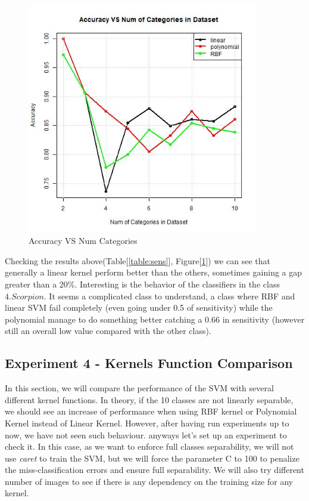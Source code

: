 \begin{minipage}{0.55\textwidth}
\begin{figure}[H]
\centering
\includegraphics[width=0.9\textwidth]{Images/Number_categories_vs_accuracystarfish_minaret.jpeg}
\caption{Accuracy VS Num Categories}
\label{fig:exp3}
\end{figure}
\end{minipage}

Checking the results above(Table[\ref{table:sens}], Figure[\ref{fig:exp3}]) we can see that generally a linear kernel perform better than the others, sometimes gaining a gap greater than a 20\%. Interesting is the behavior of the classifiers in the class $4. Scorpion$. It seems a complicated class to understand, a class where RBF and linear SVM fail completely (even going under 0.5 of sensitivity) while the polynomial manage to do something better catching a 0.66 in sensitivity (however still an overall low value compared with the other class).

\subsection{Experiment 4 - Kernels Function Comparison}

In this section, we will compare the performance of the SVM with several different kernel functions. In theory, if the 10 classes are not linearly separable, we should see an increase of performance when using RBF kernel or Polynomial Kernel instead of Linear Kernel. However, after having run experiments up to now, we have not seen such behaviour. anyways let's set up an experiment to check it. In this case, as we want to enforce full classes separability, we will not use \textit{caret} to train the SVM, but we will force the parameter C to 100 to penalize the miss-classification errors and ensure full separability. We will also try different number of images to see if there is any dependency on the training size for any kernel. 

